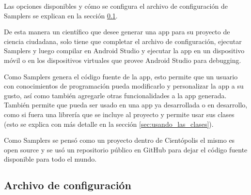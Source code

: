Las opciones disponibles y cómo se configura el archivo de configuración de Samplers se explican en la sección \ref{sec:archivo_configuracion}.

De esta manera un científico que desee generar una app para su proyecto de ciencia ciudadana, solo tiene que completar el archivo de configuración, ejecutar Samplers y luego compilar en Android Studio y ejecutar la app en un dispositivo móvil o en los dispositivos virtuales que provee Android Studio para debugging.

Como Samplers genera el código fuente de la app, esto permite que un usuario con conocimientos de programación pueda modificarlo y personalizar la app a su gusto, así como también agregarle otras funcionalidades a la app generada. También permite que pueda ser usado en una app ya desarrollada o en desarrollo, como si fuera una librería que se incluye al proyecto y permite usar sus clases (esto se explica con más detalle en la sección \ref{sec:usando_las_clases}).

Como Samplers se pensó como un proyecto dentro de Cientópolis\cite{cientopolis} el mismo es open source y se usó un repositorio público en GitHub\cite{github} para dejar el código fuente disponible para todo el mundo.

\subsection{Archivo de configuración}\label{sec:archivo_configuracion}

